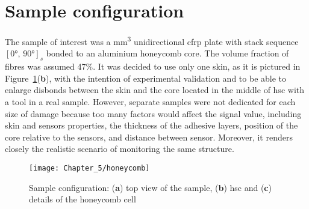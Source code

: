 \section{Sample configuration}
\label{sec:sample}

The sample of interest was a  \unit{\cubic\mm} unidirectional \ac{cfrp} plate with stack sequence \(\left[\ang{0},\,\ang{90}\right]_s\) bonded to an aluminium honeycomb core.
The volume fraction of fibres was assumed 47\%.
It was decided to use only one skin, as it is pictured in Figure~\ref{fig:honeycomb}(\textbf{b}), with the intention of experimental validation and to be able to enlarge disbonds between the skin and the core located in the middle of \ac{hsc} with a tool in a real sample. 
However, separate samples were not dedicated for each size of damage because too many factors would affect the signal value, including skin and sensors properties, the thickness of the adhesive layers, position of the core relative to the sensors, and distance between sensor.
Moreover, it renders closely the realistic scenario of monitoring the same structure.
\begin{figure}[H]
	\begin{center}
		\texttt{[image: Chapter\_5/honeycomb]}
	\end{center}
	\caption{Sample configuration: (\textbf{a}) top view of the sample, (\textbf{b}) \acl{hsc} and (\textbf{c}) details of the honeycomb cell}
	\label{fig:honeycomb}
\end{figure}

